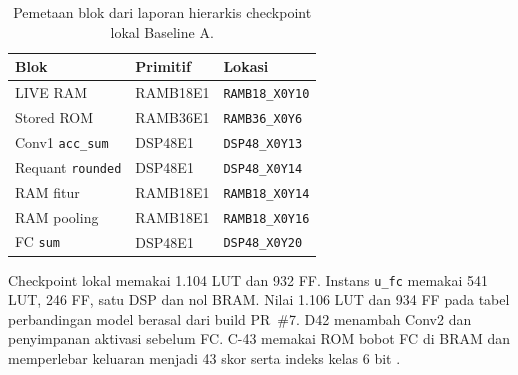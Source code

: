 \begin{table}[H]
\centering\small
\caption{Pemetaan blok dari laporan hierarkis checkpoint lokal Baseline A.}
\begin{tabularx}{\linewidth}{llX}
\toprule
Blok & Primitif & Lokasi \\
\midrule
LIVE RAM & RAMB18E1 & \texttt{RAMB18\_X0Y10} \\
Stored ROM & RAMB36E1 & \texttt{RAMB36\_X0Y6} \\
Conv1 \texttt{acc\_sum} & DSP48E1 & \texttt{DSP48\_X0Y13} \\
Requant \texttt{rounded} & DSP48E1 & \texttt{DSP48\_X0Y14} \\
RAM fitur & RAMB18E1 & \texttt{RAMB18\_X0Y14} \\
RAM pooling & RAMB18E1 & \texttt{RAMB18\_X0Y16} \\
FC \texttt{sum} & DSP48E1 & \texttt{DSP48\_X0Y20} \\
\bottomrule
\end{tabularx}
\label{tab:hw-physical}
\end{table}

Checkpoint lokal memakai 1.104 LUT dan 932 FF. Instans
\texttt{u\_fc} memakai 541 LUT, 246 FF, satu DSP dan nol BRAM.
Nilai 1.106 LUT dan 934 FF pada tabel perbandingan model berasal dari
build PR~\#7. D42 menambah Conv2 dan penyimpanan aktivasi sebelum FC.
C-43 memakai ROM bobot FC di BRAM dan memperlebar keluaran menjadi
43 skor serta indeks kelas 6 bit \cite{repo}.
